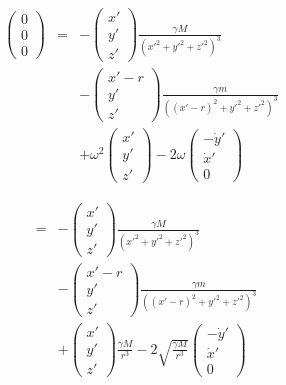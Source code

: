 \documentclass[12pt]{article}
\begin{document}
\begin{eqnarray}
\left( \begin{matrix} 0 \\ 0 \\ 0 \end{matrix} \right)
&=&
- \left( \begin{matrix} x' \\ y' \\ z' \end{matrix} \right)
 \frac{\gamma M}{\left( x'^{2} + y'^{2} + z'^{2} \right)^3} \nonumber \\ &&
- \left( \begin{matrix} x' - r \\ y' \\ z' \end{matrix} \right) \frac{\gamma m}{\left( \left(x' - r\right)^{2} + y'^{2} + z'^{2} \right)^3} \nonumber \\ &&
+ \omega^2 \left( \begin{matrix} x' \\ y' \\ z' \end{matrix} \right)
- 2 \omega \left( \begin{matrix} -\dot{y}' \\ \dot{x}' \\ 0 \end{matrix} \right)
\nonumber
\end{eqnarray}

\begin{eqnarray}
&=&
- \left( \begin{matrix} x' \\ y' \\ z' \end{matrix} \right)
 \frac{\gamma M}{\left( x'^{2} + y'^{2} + z'^{2} \right)^3} \nonumber \\ &&
- \left( \begin{matrix} x' - r \\ y' \\ z' \end{matrix} \right) \frac{\gamma m}{\left( \left(x' - r\right)^{2} + y'^{2} + z'^{2} \right)^3} \nonumber \\ &&
+ \left( \begin{matrix} x' \\ y' \\ z' \end{matrix} \right)
 \frac{\gamma M}{r^3}
- 2 \sqrt{\frac{\gamma M}{r^3}} \left( \begin{matrix} -\dot{y}' \\ \dot{x}' \\ 0 \end{matrix} \right)
\nonumber
\end{eqnarray}
\end{document}
